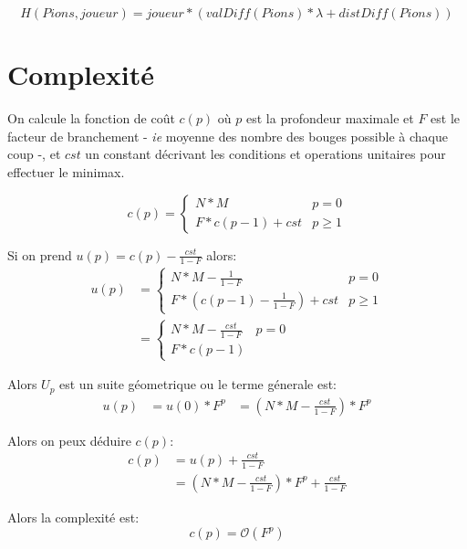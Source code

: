 \documentclass {article}
\begin{document}
\begin{equation*}
   H(Pions, joueur) = joueur * (valDiff(Pions) * \lambda + distDiff(Pions))
\end{equation*}

\section{Complexité}
On calcule la fonction de coût $c(p)$ où $p$ est la profondeur maximale et
$F$ est le facteur de branchement - \textit{ie} moyenne des nombre des bouges
possible à chaque coup -, et $cst$ un constant décrivant les conditions et
operations unitaires pour effectuer le minimax.

\begin{equation*}
   c(p) =
   \begin{cases}
      N * M            &  p = 0 \\
      F * c(p-1) + cst &  p \geq 1
   \end{cases}
\end{equation*}

Si on prend $u(p) = c(p) - \frac{cst}{1-F}$ alors:
\begin{align*}
   u(p) &=
   \begin{cases}
      N*M - \frac{1}{1-F}              & p = 0 \\
      F * (c(p-1) - \frac{1}{1-F}) + cst & p \geq 1
   \end{cases}
\\ 
    &=
   \begin{cases}
      N*M - \frac{cst}{1-F}  & p = 0 \\
      F * c(p-1)
   \end{cases}
\end{align*}

Alors $U_p$ est un suite géometrique ou le terme génerale est:
\begin{align*}
   u(p) &= u(0) * F^p
        &= (N * M - \frac{cst}{1-F}) * F^p
\end{align*}

Alors on peux déduire $c(p)$:
\begin{align*}
   c(p) &= u(p) + \frac{cst}{1-F}\\
        &= (N * M - \frac{cst}{1-F}) * F^p + \frac{cst}{1-F}
\end{align*}

Alors la complexité est:
\begin{equation*}
   c(p) = \mathcal{O}(F^p)
\end{equation*}
\end{document}
